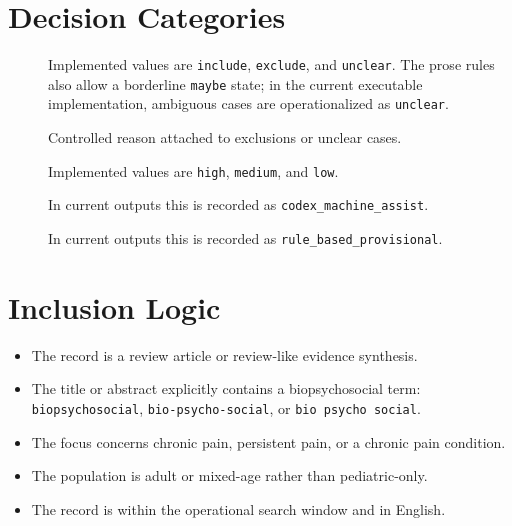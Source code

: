 \documentclass[11pt]{article}
\begin{document}
\section*{Decision Categories}
\begin{description}
\item[] Implemented values are \texttt{include}, \texttt{exclude}, and \texttt{unclear}. The prose rules also allow a borderline \texttt{maybe} state; in the current executable implementation, ambiguous cases are operationalized as \texttt{unclear}.
\item[] Controlled reason attached to exclusions or unclear cases.
\item[] Implemented values are \texttt{high}, \texttt{medium}, and \texttt{low}.
\item[] In current outputs this is recorded as \texttt{codex\_machine\_assist}.
\item[] In current outputs this is recorded as \texttt{rule\_based\_provisional}.
\end{description}

\section*{Inclusion Logic}
\begin{itemize}
\item The record is a review article or review-like evidence synthesis.
\item The title or abstract explicitly contains a biopsychosocial term: \texttt{biopsychosocial}, \texttt{bio-psycho-social}, or \texttt{bio psycho social}.
\item The focus concerns chronic pain, persistent pain, or a chronic pain condition.
\item The population is adult or mixed-age rather than pediatric-only.
\item The record is within the operational search window and in English.
\end{itemize}
\end{document}
